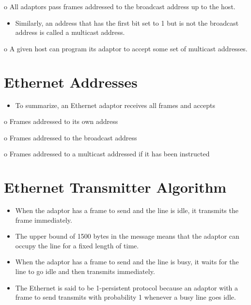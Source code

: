 \documentclass[10pt]{article}
\begin{document}
o All adaptors pass frames addressed to the broadcast address up to the host.

\begin{itemize}
  \item Similarly, an address that has the first bit set to 1 but is not the broadcast address is called a multicast address.
\end{itemize}

o A given host can program its adaptor to accept some set of multicast addresses.

\section{Ethernet Addresses}
\begin{itemize}
  \item To summarize, an Ethernet adaptor receives all frames and accepts
\end{itemize}

o Frames addressed to its own address

o Frames addressed to the broadcast address

o Frames addressed to a multicast addressed if it has been instructed

\section{Ethernet Transmitter Algorithm}
\begin{itemize}
  \item When the adaptor has a frame to send and the line is idle, it transmits the frame immediately.

  \item The upper bound of 1500 bytes in the message means that the adaptor can occupy the line for a fixed length of time.

  \item When the adaptor has a frame to send and the line is busy, it waits for the line to go idle and then transmits immediately.

  \item The Ethernet is said to be 1-persistent protocol because an adaptor with a frame to send transmits with probability 1 whenever a busy line goes idle.

\end{itemize}
\end{document}
